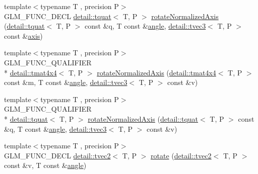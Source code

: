 \begin{DoxyCompactItemize}
\item 
{\footnotesize template$<$typename T , precision P$>$ }\\G\-L\-M\-\_\-\-F\-U\-N\-C\-\_\-\-D\-E\-C\-L \hyperlink{structglm_1_1detail_1_1tquat}{detail\-::tquat}$<$ T, P $>$ \hyperlink{group__gtx__rotate__normalized__axis_ga774f0f09fc99b3a967001cb116aa7f2a}{rotate\-Normalized\-Axis} (\hyperlink{structglm_1_1detail_1_1tquat}{detail\-::tquat}$<$ T, P $>$ const \&q, T const \&\hyperlink{group__gtc__quaternion_ga23a3fc7ada5bbb665ff84c92c6e0542c}{angle}, \hyperlink{structglm_1_1detail_1_1tvec3}{detail\-::tvec3}$<$ T, P $>$ const \&\hyperlink{group__gtc__quaternion_ga8eef9f8c3f2e4836dccf09df975b20fb}{axis})
\item 
{\footnotesize template$<$typename T , precision P$>$ }\\G\-L\-M\-\_\-\-F\-U\-N\-C\-\_\-\-Q\-U\-A\-L\-I\-F\-I\-E\-R \\*
\hyperlink{structglm_1_1detail_1_1tmat4x4}{detail\-::tmat4x4}$<$ T, P $>$ \hyperlink{group__gtx__rotate__normalized__axis_gac47b4efcecdaf7e892b10ae89135c544}{rotate\-Normalized\-Axis} (\hyperlink{structglm_1_1detail_1_1tmat4x4}{detail\-::tmat4x4}$<$ T, P $>$ const \&m, T const \&\hyperlink{group__gtc__quaternion_ga23a3fc7ada5bbb665ff84c92c6e0542c}{angle}, \hyperlink{structglm_1_1detail_1_1tvec3}{detail\-::tvec3}$<$ T, P $>$ const \&v)
\item 
{\footnotesize template$<$typename T , precision P$>$ }\\G\-L\-M\-\_\-\-F\-U\-N\-C\-\_\-\-Q\-U\-A\-L\-I\-F\-I\-E\-R \\*
\hyperlink{structglm_1_1detail_1_1tquat}{detail\-::tquat}$<$ T, P $>$ \hyperlink{group__gtx__rotate__normalized__axis_ga774f0f09fc99b3a967001cb116aa7f2a}{rotate\-Normalized\-Axis} (\hyperlink{structglm_1_1detail_1_1tquat}{detail\-::tquat}$<$ T, P $>$ const \&q, T const \&\hyperlink{group__gtc__quaternion_ga23a3fc7ada5bbb665ff84c92c6e0542c}{angle}, \hyperlink{structglm_1_1detail_1_1tvec3}{detail\-::tvec3}$<$ T, P $>$ const \&v)
\item 
{\footnotesize template$<$typename T , precision P$>$ }\\G\-L\-M\-\_\-\-F\-U\-N\-C\-\_\-\-D\-E\-C\-L \hyperlink{structglm_1_1detail_1_1tvec2}{detail\-::tvec2}$<$ T, P $>$ \hyperlink{group__gtx__rotate__vector_ga5520f6dd671807ec62a8f97c00c1b78b}{rotate} (\hyperlink{structglm_1_1detail_1_1tvec2}{detail\-::tvec2}$<$ T, P $>$ const \&v, T const \&\hyperlink{group__gtc__quaternion_ga23a3fc7ada5bbb665ff84c92c6e0542c}{angle})
\item 

\end{DoxyCompactItemize}
